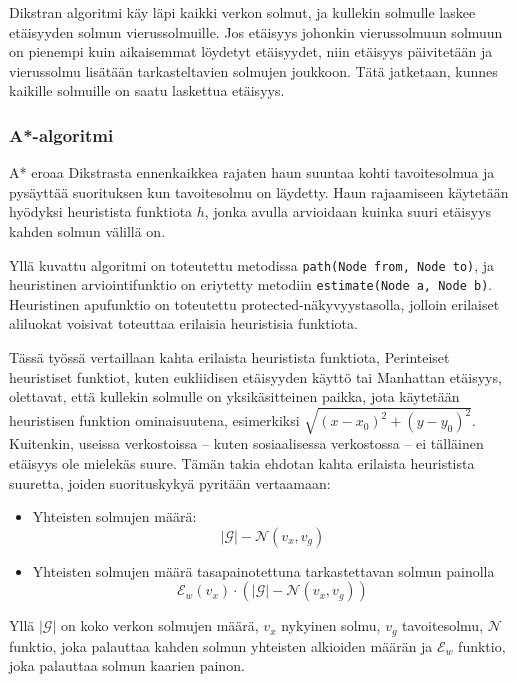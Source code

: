 \documentclass[10pt,a4paper]{article}
\begin{document}
Dikstran algoritmi käy läpi kaikki verkon solmut, ja kullekin solmulle laskee etäisyyden solmun vierussolmuille. Jos etäisyys johonkin vierussolmuun solmuun on pienempi kuin aikaisemmat löydetyt etäisyydet, niin etäisyys päivitetään ja vierussolmu lisätään tarkasteltavien solmujen joukkoon. Tätä jatketaan, kunnes kaikille solmuille on saatu laskettua etäisyys.

\subsubsection{A*-algoritmi}

A* eroaa Dikstrasta ennenkaikkea rajaten haun suuntaa kohti tavoitesolmua ja pysäyttää suorituksen kun tavoitesolmu on läydetty. Haun rajaamiseen käytetään hyödyksi heuristista funktiota $h$, jonka avulla arvioidaan kuinka suuri etäisyys kahden solmun välillä on.

Yllä kuvattu algoritmi on toteutettu metodissa \texttt{path(Node from, Node to)}, ja heuristinen arviointifunktio on eriytetty metodiin \texttt{estimate(Node a, Node b)}. Heuristinen apufunktio on toteutettu protected-näkyvyystasolla, jolloin erilaiset aliluokat voisivat toteuttaa erilaisia heuristisia funktiota.

Tässä työssä vertaillaan kahta erilaista heuristista funktiota, Perinteiset heuristiset funktiot, kuten eukliidisen etäisyyden käyttö tai Manhattan etäisyys, olettavat, että kullekin solmulle on yksikäsitteinen paikka, jota käytetään heuristisen funktion ominaisuutena, esimerkiksi $\sqrt{ (x-x_0)^2 + (y-y_0)^2 }$. Kuitenkin, useissa verkostoissa -- kuten sosiaalisessa verkostossa -- ei tälläinen etäisyys ole mielekäs suure. Tämän takia ehdotan kahta erilaista heuristista suuretta, joiden suorituskykyä pyritään vertaamaan:

\begin{itemize}
\item Yhteisten solmujen määrä: $$ |\mathcal{G}| - \mathcal{N}( v_x , v_g )$$
\item Yhteisten solmujen määrä tasapainotettuna tarkastettavan solmun painolla $$ \mathcal{E}_w ( v_x ) \cdot ( |\mathcal{G}| - \mathcal{N}( v_x , v_g ) ) $$
\end{itemize}

Yllä $|\mathcal{G}|$ on koko verkon solmujen määrä, $v_x$ nykyinen solmu, $v_g$ tavoitesolmu, $\mathcal{N}$ funktio, joka palauttaa kahden solmun yhteisten alkioiden määrän ja $ \mathcal{E}_w $ funktio, joka palauttaa solmun kaarien painon.
\end{document}
